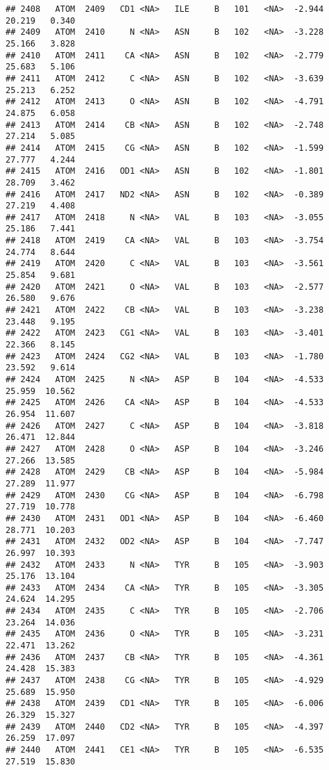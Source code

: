 \documentclass[
]{article}
\begin{document}
\begin{verbatim}
## 2408   ATOM  2409   CD1 <NA>   ILE     B   101   <NA>  -2.944  20.219   0.340
## 2409   ATOM  2410     N <NA>   ASN     B   102   <NA>  -3.228  25.166   3.828
## 2410   ATOM  2411    CA <NA>   ASN     B   102   <NA>  -2.779  25.683   5.106
## 2411   ATOM  2412     C <NA>   ASN     B   102   <NA>  -3.639  25.213   6.252
## 2412   ATOM  2413     O <NA>   ASN     B   102   <NA>  -4.791  24.875   6.058
## 2413   ATOM  2414    CB <NA>   ASN     B   102   <NA>  -2.748  27.214   5.085
## 2414   ATOM  2415    CG <NA>   ASN     B   102   <NA>  -1.599  27.777   4.244
## 2415   ATOM  2416   OD1 <NA>   ASN     B   102   <NA>  -1.801  28.709   3.462
## 2416   ATOM  2417   ND2 <NA>   ASN     B   102   <NA>  -0.389  27.219   4.408
## 2417   ATOM  2418     N <NA>   VAL     B   103   <NA>  -3.055  25.186   7.441
## 2418   ATOM  2419    CA <NA>   VAL     B   103   <NA>  -3.754  24.774   8.644
## 2419   ATOM  2420     C <NA>   VAL     B   103   <NA>  -3.561  25.854   9.681
## 2420   ATOM  2421     O <NA>   VAL     B   103   <NA>  -2.577  26.580   9.676
## 2421   ATOM  2422    CB <NA>   VAL     B   103   <NA>  -3.238  23.448   9.195
## 2422   ATOM  2423   CG1 <NA>   VAL     B   103   <NA>  -3.401  22.366   8.145
## 2423   ATOM  2424   CG2 <NA>   VAL     B   103   <NA>  -1.780  23.592   9.614
## 2424   ATOM  2425     N <NA>   ASP     B   104   <NA>  -4.533  25.959  10.562
## 2425   ATOM  2426    CA <NA>   ASP     B   104   <NA>  -4.533  26.954  11.607
## 2426   ATOM  2427     C <NA>   ASP     B   104   <NA>  -3.818  26.471  12.844
## 2427   ATOM  2428     O <NA>   ASP     B   104   <NA>  -3.246  27.266  13.585
## 2428   ATOM  2429    CB <NA>   ASP     B   104   <NA>  -5.984  27.289  11.977
## 2429   ATOM  2430    CG <NA>   ASP     B   104   <NA>  -6.798  27.719  10.778
## 2430   ATOM  2431   OD1 <NA>   ASP     B   104   <NA>  -6.460  28.771  10.203
## 2431   ATOM  2432   OD2 <NA>   ASP     B   104   <NA>  -7.747  26.997  10.393
## 2432   ATOM  2433     N <NA>   TYR     B   105   <NA>  -3.903  25.176  13.104
## 2433   ATOM  2434    CA <NA>   TYR     B   105   <NA>  -3.305  24.624  14.295
## 2434   ATOM  2435     C <NA>   TYR     B   105   <NA>  -2.706  23.264  14.036
## 2435   ATOM  2436     O <NA>   TYR     B   105   <NA>  -3.231  22.471  13.262
## 2436   ATOM  2437    CB <NA>   TYR     B   105   <NA>  -4.361  24.428  15.383
## 2437   ATOM  2438    CG <NA>   TYR     B   105   <NA>  -4.929  25.689  15.950
## 2438   ATOM  2439   CD1 <NA>   TYR     B   105   <NA>  -6.006  26.329  15.327
## 2439   ATOM  2440   CD2 <NA>   TYR     B   105   <NA>  -4.397  26.259  17.097
## 2440   ATOM  2441   CE1 <NA>   TYR     B   105   <NA>  -6.535  27.519  15.830

\end{verbatim}
\end{document}
